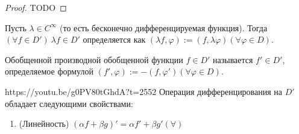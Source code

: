 \begin{proof}
	TODO
\end{proof}

\begin{Def}
	Пусть $\lambda\in C^\infty$ (то есть бесконечно дифференцируемая функция). Тогда $(\forall f\in D')\ \lambda f\in D'$ определяется как $(\lambda f,\varphi):=(f,\lambda\varphi) (\forall\varphi\in D)$.
\end{Def}

\begin{Def}
	Обобщенной производной обобщенной функции $f\in D'$ называется $f'\in D'$, определяемое формулой $(f',\varphi):=-(f,\varphi') (\forall\varphi\in D)$.
\end{Def}

\begin{linkthm}{https://youtu.be/g0PV80tGhdA?t=2552}
	Операция дифференцирования на $D'$ обладает следующими свойствами:
	\begin{enumerate}
		\item (Линейность) $(\alpha f+\beta g)'=\alpha f'+\beta g'(\forall)$
	\end{enumerate}
\end{linkthm}









